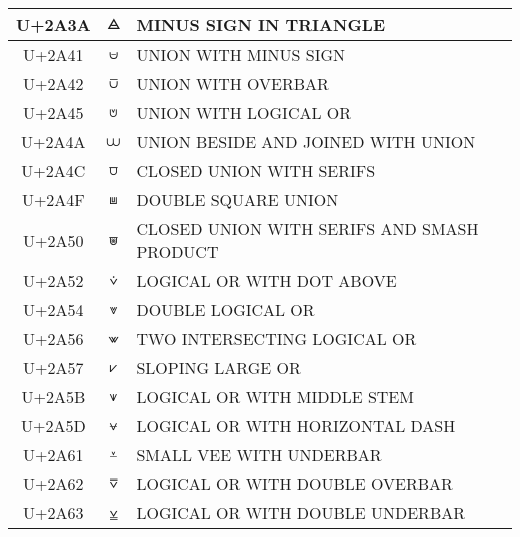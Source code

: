\documentclass[a4paper]{article}
\begin{document}
\begin{longtable}{ccl}
  U+2A3A & \texttt{⨺}  & MINUS SIGN IN TRIANGLE \\ \hline
  U+2A41 & \texttt{⩁}  & UNION WITH MINUS SIGN \\ \hline
  U+2A42 & \texttt{⩂}  & UNION WITH OVERBAR \\ \hline
  U+2A45 & \texttt{⩅}  & UNION WITH LOGICAL OR \\ \hline
  U+2A4A & \texttt{⩊}  & UNION BESIDE AND JOINED WITH UNION \\ \hline
  U+2A4C & \texttt{⩌}  & CLOSED UNION WITH SERIFS \\ \hline
  U+2A4F & \texttt{⩏}  & DOUBLE SQUARE UNION \\ \hline
  U+2A50 & \texttt{⩐}  & CLOSED UNION WITH SERIFS AND SMASH PRODUCT \\ \hline
  U+2A52 & \texttt{⩒}  & LOGICAL OR WITH DOT ABOVE \\ \hline
  U+2A54 & \texttt{⩔}  & DOUBLE LOGICAL OR \\ \hline
  U+2A56 & \texttt{⩖}  & TWO INTERSECTING LOGICAL OR \\ \hline
  U+2A57 & \texttt{⩗}  & SLOPING LARGE OR \\ \hline
  U+2A5B & \texttt{⩛}  & LOGICAL OR WITH MIDDLE STEM \\ \hline
  U+2A5D & \texttt{⩝}  & LOGICAL OR WITH HORIZONTAL DASH \\ \hline
  U+2A61 & \texttt{⩡}  & SMALL VEE WITH UNDERBAR \\ \hline
  U+2A62 & \texttt{⩢}  & LOGICAL OR WITH DOUBLE OVERBAR \\ \hline
  U+2A63 & \texttt{⩣}  & LOGICAL OR WITH DOUBLE UNDERBAR \\ \hline

  \bottomrule
\end{longtable}
\end{document}
